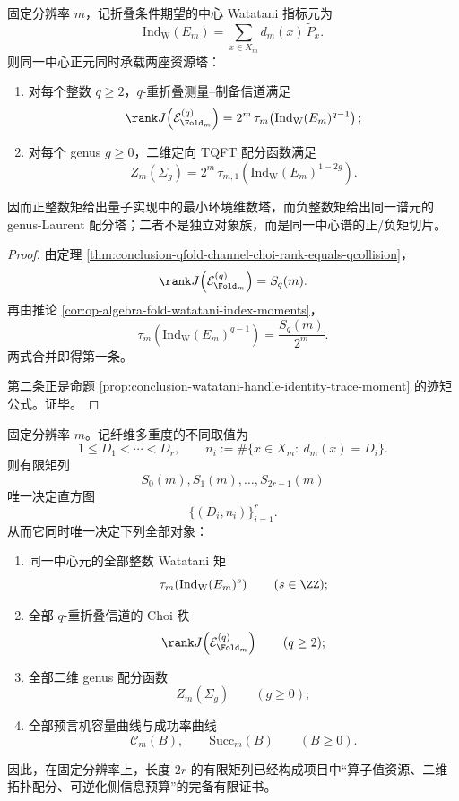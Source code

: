 \begin{theorem}\label{thm:derived-watatani-positive-laurent-towers}
固定分辨率 \(m\)，记折叠条件期望的中心 Watatani 指标元为
\[
\mathrm{Ind}_{\mathrm W}(E_m)=\sum_{x\in X_m}d_m(x)\,\widetilde P_x.
\]
则同一中心正元同时承载两座资源塔：
\begin{enumerate}
\normalfont
  \item 对每个整数 \(q\ge 2\)，\(q\)-重折叠测量--制备信道满足
  \[
  \rank J\!\left(\mathcal E_{\Fold_m}^{(q)}\right)
  =
  2^m\,\tau_m\!\left(\mathrm{Ind}_{\mathrm W}(E_m)^{q-1}\right);
  \]
  \item 对每个 genus \(g\ge 0\)，二维定向 TQFT 配分函数满足
  \[
  Z_m(\Sigma_g)
  =
  2^m\,\tau_{m,1}\!\left(\mathrm{Ind}_{\mathrm W}(E_m)^{1-2g}\right).
  \]
\end{enumerate}
因而正整数矩给出量子实现中的最小环境维数塔，而负整数矩给出同一谱元的 genus-Laurent 配分塔；二者不是独立对象族，而是同一中心谱的正/负矩切片。
\end{theorem}

\begin{proof}
由定理 \ref{thm:conclusion-qfold-channel-choi-rank-equals-qcollision}，
\[
\rank J\!\left(\mathcal E_{\Fold_m}^{(q)}\right)=S_q(m).
\]
再由推论 \ref{cor:op-algebra-fold-watatani-index-moments}，
\[
\tau_m\!\left(\mathrm{Ind}_{\mathrm W}(E_m)^{q-1}\right)=\frac{S_q(m)}{2^m}.
\]
两式合并即得第一条。

第二条正是命题 \ref{prop:conclusion-watatani-handle-identity-trace-moment} 的迹矩公式。证毕。
\end{proof}

\begin{theorem}\label{thm:derived-finite-moments-complete-operator-topology-capacity}
固定分辨率 \(m\)。记纤维多重度的不同取值为
\[
1\le D_1<\cdots<D_r,
\qquad
n_i:=\#\{x\in X_m:\ d_m(x)=D_i\}.
\]
则有限矩列
\[
S_0(m),S_1(m),\dots,S_{2r-1}(m)
\]
唯一决定直方图
\[
\{(D_i,n_i)\}_{i=1}^r.
\]
从而它同时唯一决定下列全部对象：
\begin{enumerate}
\normalfont
  \item 同一中心元的全部整数 Watatani 矩
  \[
  \tau_m\!\left(\mathrm{Ind}_{\mathrm W}(E_m)^s\right)
  \qquad (s\in \ZZ);
  \]
  \item 全部 \(q\)-重折叠信道的 Choi 秩
  \[
  \rank J\!\left(\mathcal E_{\Fold_m}^{(q)}\right)
  \qquad (q\ge 2);
  \]
  \item 全部二维 genus 配分函数
  \[
  Z_m(\Sigma_g)
  \qquad (g\ge 0);
  \]
  \item 全部预言机容量曲线与成功率曲线
  \[
  \mathcal C_m(B),
  \qquad
  \mathrm{Succ}_m(B)
  \qquad (B\ge 0).
  \]
\end{enumerate}
因此，在固定分辨率上，长度 \(2r\) 的有限矩列已经构成项目中“算子值资源、二维拓扑配分、可逆化侧信息预算”的完备有限证书。
\end{theorem}

